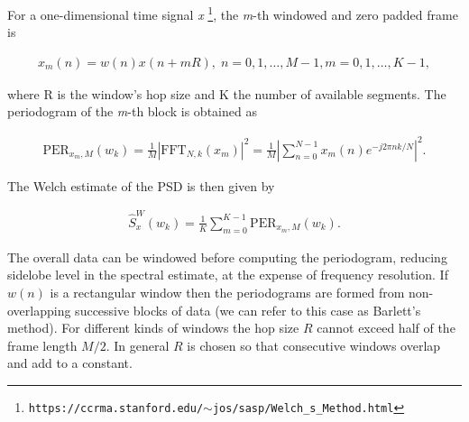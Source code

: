 	For a one-dimensional time signal \textit{x} \cite{SASPWEB2011}\footnote{\texttt{https://ccrma.stanford.edu/$\sim$jos/sasp/Welch\_s\_Method.html}}, the \textit{m}-th windowed and zero padded frame is
	
	\begin{align}
		x_m(n) = w(n)x(n + mR), \; n=0,1,\ldots, M-1, m=0,1,\ldots, K-1,
	\end{align}
	
	where R is the window's hop size and K the number of available segments. The periodogram of the \textit{m}-th block is obtained as
	
	\begin{align}
		\text{PER}_{x_m,M}(w_k) = \frac{1}{M} |\text{FFT}_{N,k}(x_m)|^2 = \frac{1}{M}\left|\sum_{n=0}^{N-1}x_m(n)e^{-j2\pi nk/N}\right|^2.
	\end{align}
	
	The Welch estimate of the PSD is then given by
	
	\begin{align}
		\hat{S}^W_x(w_k) = \frac{1}{K}\sum_{m=0}^{K-1}\text{PER}_{x_m,M}(w_k).
	\end{align}
	
	The overall data can be windowed before computing the periodogram, reducing sidelobe level in the spectral estimate, at the expense of frequency resolution. If $w(n)$ is a rectangular window then the periodograms are formed from non-overlapping successive blocks of data (we can refer to this case as Barlett's method). For different kinds of windows the hop size $R$ cannot exceed half of the frame length $M/2$. In general $R$ is chosen so that consecutive windows overlap and add to a constant.
	
	
	

	

    
    
    